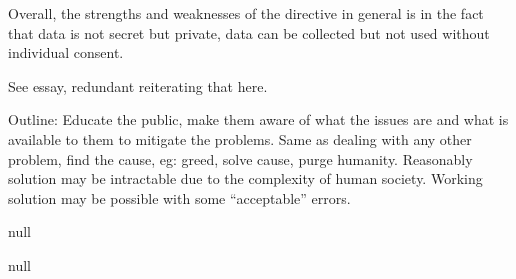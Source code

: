 Overall, the strengths and weaknesses of the directive in general is in the fact that data is not secret but private, data can be collected but not used without individual consent.


See essay, redundant reiterating that here.

Outline: Educate the public, make them aware of what the issues are and what is available to them to mitigate the problems. Same as dealing with any other problem, find the cause, eg: greed, solve cause, purge humanity. Reasonably solution may be intractable due to the complexity of human society. Working solution may be possible with some ``acceptable'' errors.


null


null

\bye
